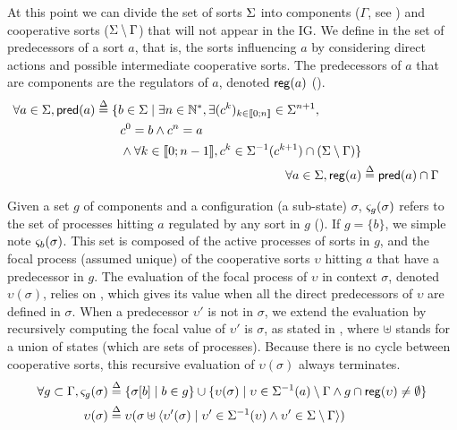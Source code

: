 At this point we can divide the set of sorts $\Sigma$ into components ($\Gamma$, see ) and cooperative sorts
($\Sigma \setminus \Gamma$) that will not appear in the IG. 
We define in  the set of predecessors of a sort $a$, that is, the sorts influencing $a$
by considering direct actions and possible intermediate cooperative sorts.
The predecessors of $a$ that are components are the regulators of $a$, denoted $\mathsf{reg}({a})$
().
\begin{align}
\begin{split}
\forall a \in \Sigma, \mathsf{pred}(a) &\stackrel{\Delta}= \{b \in \Sigma \mid \exists n \in \mathbb{N}^*, \exists
(c^k)_{k \in \llbracket 0 ; n \rrbracket} \in \Sigma^{n+1}, \\
                                   & \quad \quad c^0 = b \wedge c^n = a \\
                                   & \quad \quad \wedge \forall k \in \llbracket 0 ; n-1 \rrbracket,
                   c^k \in \Sigma^{-1}(c^{k+1}) \cap (\Sigma\setminus\Gamma)\}
\end{split}
\label{eq:ph_predec}
\\
\forall a\in \Sigma, \mathsf{reg}({a}) & \stackrel{\Delta}= \mathsf{pred}(a) \cap \Gamma
\label{eq:regulators}
\end{align}

Given a set $g$ of components and a configuration (\ie a sub-state) $\sigma$, $\varsigma_g(\sigma)$
refers to the set of processes hitting $a$ regulated by any sort in $g$ ().
If $g=\{b\}$, we simple note $\varsigma_b(\sigma)$.
This set is composed of the active processes of sorts in $g$, and the focal process (assumed
unique) of the cooperative sorts $\upsilon$ hitting $a$ that have a predecessor in $g$.
The evaluation of the focal process of $\upsilon$ in context $\sigma$, denoted $\upsilon(\sigma)$,
relies on , which gives its value when all the direct predecessors of
$\upsilon$ are defined in $\sigma$.
When a predecessor $\upsilon'$ is not in $\sigma$, we extend the evaluation by recursively computing
the focal value of $\upsilon'$ is $\sigma$, as stated in ,
where $\uplus$ stands for a union of states (which are sets of processes).
Because there is no cycle between cooperative sorts, this recursive evaluation of $\upsilon(\sigma)$
always terminates.
\begin{align}
\forall g\subset \Gamma,
  \varsigma_g(\sigma) & \stackrel{\Delta}= \{ \sigma[b] \mid b\in g \} \cup \{ \upsilon(\sigma) \mid
\upsilon\in\Sigma^{-1}(a) \setminus \Gamma \wedge g\cap \mathsf{reg}({\upsilon}) \neq \emptyset \}
\label{eq:ctx-sigma}
\\
\upsilon(\sigma) & \stackrel{\Delta}=
\upsilon(\sigma \uplus \langle \upsilon'(\sigma) \mid 
  \upsilon'\in\Sigma^{-1}(\upsilon) \wedge
  \upsilon'\in\Sigma\setminus\Gamma  \rangle)
\label{eq:cooperative-eval}
\end{align}

